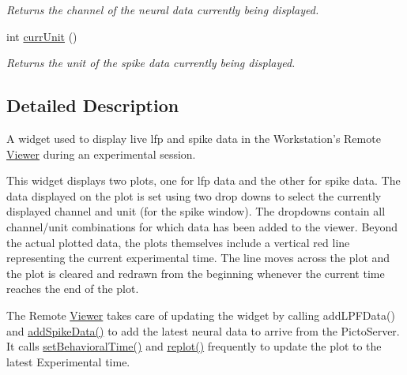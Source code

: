 \begin{DoxyCompactItemize}
\begin{DoxyCompactList}\small\item\em Returns the channel of the neural data currently being displayed. \end{DoxyCompactList}\item 
\hypertarget{class_neural_data_viewer_a17ce9132f1eacd87868566ac7c40bb62}{int \hyperlink{class_neural_data_viewer_a17ce9132f1eacd87868566ac7c40bb62}{curr\-Unit} ()}\label{class_neural_data_viewer_a17ce9132f1eacd87868566ac7c40bb62}

\begin{DoxyCompactList}\small\item\em Returns the unit of the spike data currently being displayed. \end{DoxyCompactList}\end{DoxyCompactItemize}


\subsection{Detailed Description}
A widget used to display live lfp and spike data in the Workstation's Remote \hyperlink{class_viewer}{Viewer} during an experimental session. 

This widget displays two plots, one for lfp data and the other for spike data. The data displayed on the plot is set using two drop downs to select the currently displayed channel and unit (for the spike window). The dropdowns contain all channel/unit combinations for which data has been added to the viewer. Beyond the actual plotted data, the plots themselves include a vertical red line representing the current experimental time. The line moves across the plot and the plot is cleared and redrawn from the beginning whenever the current time reaches the end of the plot.

The Remote \hyperlink{class_viewer}{Viewer} takes care of updating the widget by calling add\-L\-P\-F\-Data() and \hyperlink{class_neural_data_viewer_ab1e672e37e9902a1053996be1e60949f}{add\-Spike\-Data()} to add the latest neural data to arrive from the Picto\-Server. It calls \hyperlink{class_neural_data_viewer_a2ca4a819f8149a661a30bb1fe64f455c}{set\-Behavioral\-Time()} and \hyperlink{class_neural_data_viewer_a4157c87495c85be09e6450f94642efd0}{replot()} frequently to update the plot to the latest Experimental time.

